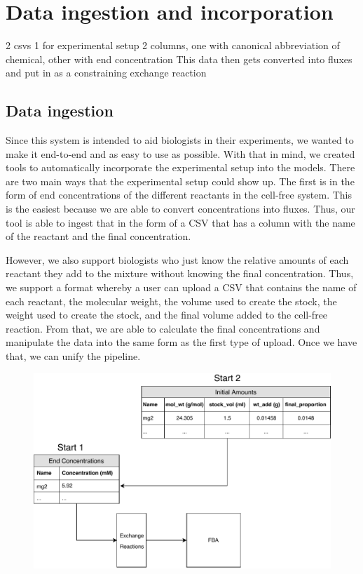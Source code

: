 \section{Data ingestion and incorporation}
2 csvs
1 for experimental setup
2 columns, one with canonical abbreviation of chemical, other with end concentration
This data then gets converted into fluxes and put in as a constraining exchange reaction

\subsection{Data ingestion}
Since this system is intended to aid biologists in their experiments, we wanted to make it end-to-end and as easy to use as possible.
With that in mind, we created tools to automatically incorporate the experimental setup into the models.
There are two main ways that the experimental setup could show up.
The first is in the form of end concentrations of the different reactants in the cell-free system.
This is the easiest because we are able to convert concentrations into fluxes.
Thus, our tool is able to ingest that in the form of a CSV that has a column with the name of the reactant and the final concentration.

However, we also support biologists who just know the relative amounts of each reactant they add to the mixture without knowing the final concentration.
Thus, we support a format whereby a user can upload a CSV that contains the name of each reactant, the molecular weight, the volume used to create the stock, the weight used to create the stock, and the final volume added to the cell-free reaction.
From that, we are able to calculate the final concentrations and manipulate the data into the same form as the first type of upload.
Once we have that, we can unify the pipeline.

\begin{figure}[t!]
\begin{center}
\includegraphics{figs/DataIngestion.pdf}
\caption{}
\end{center}
\label{fig:ingest}
\end{figure}

